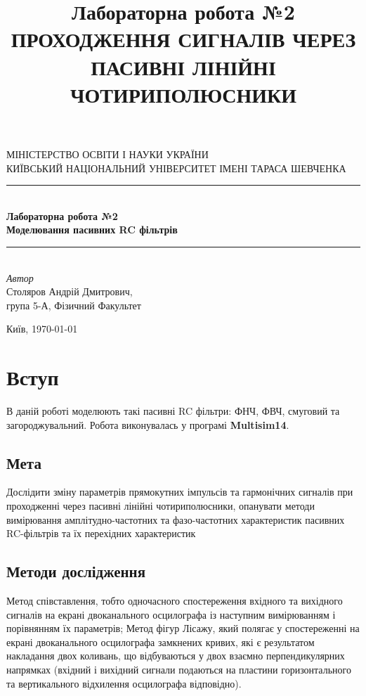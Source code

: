 \documentclass[
  ukrainian,
  14pt
]{extreport}
\author{}
\title{\Huge Лабораторна робота №2 \\\Large ПРОХОДЖЕННЯ СИГНАЛІВ
ЧЕРЕЗ ПАСИВНІ ЛІНІЙНІ ЧОТИРИПОЛЮСНИКИ}
\date{}
\begin{document}
\begin{titlepage} 
	\newcommand{\HRule}{\rule{\linewidth}{0.5mm}} 
	
	\center 
	
	\textsc{\Large МІНІСТЕРСТВО ОСВІТИ І НАУКИ УКРАЇНИ\\ \Large КИЇВСЬКИЙ НАЦІОНАЛЬНИЙ УНІВЕРСИТЕТ ІМЕНІ ТАРАСА ШЕВЧЕНКА}\\[1.5cm] 

	
	\HRule\\[0.4cm]
	
	{\huge \bfseries  Лабораторна робота №2 \\\Large \bfseries Моделювання пасивних RC фільтрів
    }\\[0.4cm]
	
	\HRule\\[1.5cm]

	
	

	{\large\textit{Автор}}\\
	\large Столяров Андрій Дмитрович, \\\large група 5-А, Фізичний Факультет 
	
	
	\vfill\vfill\vfill 
	\vfill
	{\normalsize Київ, \today} 
\end{titlepage}
\tableofcontents
\clearpage
\section{Вступ}
В даній роботі моделюють такі пасивні RC
фільтри: ФНЧ, ФВЧ, смуговий та
загороджувальний. Робота виконувалась у програмі \textbf{Multisim14}.
\subsection{Мета}
Дослідити зміну параметрів прямокутних імпульсів та гармонічних сигналів при
проходженні через пасивні лінійні чотириполюсники, опанувати методи вимірювання
амплітудно-частотних та фазо-частотних характеристик пасивних RC-фільтрів та їх перехідних характеристик
\subsection{Методи дослідження}
Метод співставлення, тобто одночасного спостереження вхідного та вихідного сигналів на екрані двоканального осцилографа із наступним вимірюванням і порівнянням
їх параметрів;
Метод фігур Лісажу, який полягає у спостереженні на екрані двоканального
осцилографа замкнених кривих, які є результатом накладання двох коливань, що відбуваються у двох взаємно перпендикулярних напрямках (вхідний і вихідний сигнали
подаються на пластини горизонтального та вертикального відхилення осцилографа відповідно).
\end{document}
